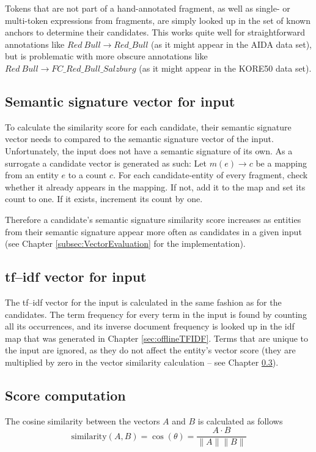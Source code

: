 \documentclass[runningheads,a4paper]{llncs}
\begin{document}
{Tokens that are not part of a hand-annotated fragment, as well as single- or multi-token expressions from fragments, are simply looked up in the set of known anchors to determine their candidates. This works quite well for straightforward annotations like $Red\ Bull \rightarrow Red\_Bull$ (as it might appear in the AIDA data set), but is problematic with more obscure annotations like $Red\ Bull \rightarrow FC\_Red\_Bull\_Salzburg$ (as it might appear in the KORE50 data set).

\subsection{Semantic signature vector for input}\label{subsection:semSigVector}
To calculate the similarity score for each candidate, their semantic signature vector needs to compared to the semantic signature vector of the input. Unfortunately, the input does not have a semantic signature of its own. As a surrogate a candidate vector is generated as such: Let $m(e) \rightarrow c$ be a mapping from an entity $e$ to a count $c$. For each candidate-entity of every fragment, check whether it already appears in the mapping. If not, add it to the map and set its count to one. If it exists, increment its count by one.

Therefore a candidate's semantic signature similarity score increases as entities from their semantic signature appear more often as candidates in a given input (see Chapter \ref{subsec:VectorEvaluation} for the implementation).

\subsection{tf--idf vector for input}\label{subsec:tfidfInput}
The tf--idf vector for the input is calculated in the same fashion as for the candidates. The term frequency for every term in the input is found by counting all its occurrences, and its inverse document frequency is looked up in the idf map that was generated in Chapter \ref{sec:offlineTFIDF}. Terms that are unique to the input are ignored, as they do not affect the entity's vector score (they are multiplied by zero in the vector similarity calculation -- see Chapter \ref{sec:score computation}).

\subsection{Score computation}\label{sec:score computation}
The cosine similarity between the vectors $A$ and $B$ is calculated as follows
$$\mathrm{similarity}(A, B) = \cos(\theta) = \frac{A \cdot B}{\|A\| \|B\|}$$

}
\end{document}
